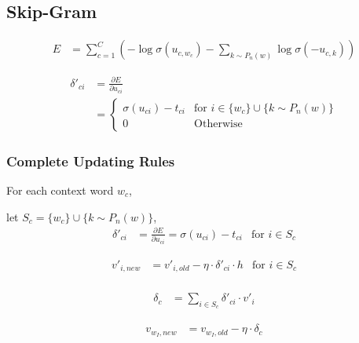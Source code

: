 \documentclass{article}
\begin{document}
	\subsection {Skip-Gram} 

	\begin{equation}
		\begin{aligned}
			E &= \sum_{c=1}^{C} \left( -\log \sigma(u_{c,w_c}) -  \sum_{k \sim P_n(w)} \log \sigma (-u_{c,k})  \right)
		\end{aligned}
	\end{equation}
	
	\begin{equation}
		\begin{aligned}
			\delta'_{ci} &= \frac{\partial E}{\partial u_{ci}} \\
			&=
			\begin{cases}
				\sigma(u_{ci}) - t_{ci}  &\mbox{for $i \in \{w_c\} \cup \{k \sim P_n(w) \}$}\\
				0  &\mbox{Otherwise}
			\end{cases}
		\end{aligned}
	\end{equation}
	
	\subsubsection*{Complete Updating Rules}
	For each context word $w_c$, 
	\begin{framed}
	\centering
	let $S_{c} = \{w_c\} \cup \{k \sim P_n(w) \}$, \\
	\begin{equation}
	\begin{aligned}
		\delta'_{ci} &= \frac{\partial E}{\partial u_{ci}} = \sigma(u_{ci}) - t_{ci} &\mbox{for $i \in S_c$}
	\end{aligned}
	\end{equation}
	
	\begin{equation}
	\begin{aligned}
		v'_{i, new} &= v'_{i, old} - \eta \cdot \delta'_{ci} \cdot h  &\mbox{for $i \in S_c$}\\
	\end{aligned}
	\end{equation}
	
	\begin{equation}
	\begin{aligned}
		\delta_c &= \sum_{i \in S_c} \delta'_{ci} \cdot v'_{i}
	\end{aligned}
	\end{equation}
	
	\begin{equation}
	\begin{aligned}
		v_{w_I, new} &= v_{w_I, old} - \eta \cdot \delta_c 
	\end{aligned}
	\end{equation}
	\end{framed}
\end{document}

